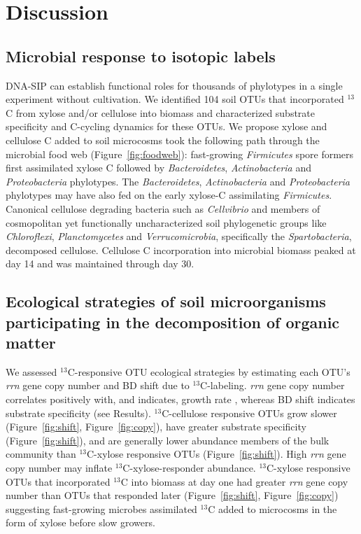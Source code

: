 \section{Discussion} 
\subsection{Microbial response to isotopic labels}
DNA-SIP can establish functional roles for thousands of phylotypes in a single
experiment without cultivation. We identified 104 soil OTUs that
incorporated $^{13}$C from xylose and/or cellulose into biomass and
characterized substrate specificity and C-cycling dynamics for these OTUs. We
propose xylose and cellulose C added to soil microcosms took the following path
through the microbial food web (Figure~\ref{fig:foodweb}): fast-growing
\textit{Firmicutes} spore formers first assimilated xylose C followed by
\textit{Bacteroidetes}, \textit{Actinobacteria} and \textit{Proteobacteria}
phylotypes. The \textit{Bacteroidetes}, \textit{Actinobacteria} and
\textit{Proteobacteria} phylotypes may have also fed on the early xylose-C
assimilating \textit{Firmicutes}. Canonical cellulose degrading bacteria such
as \textit{Cellvibrio} and members of cosmopolitan yet functionally
uncharacterized soil phylogenetic groups like \textit{Chloroflexi},
\textit{Planctomycetes} and \textit{Verrucomicrobia}, specifically the
\textit{Spartobacteria}, decomposed cellulose. Cellulose C incorporation into
microbial biomass peaked at day 14 and was maintained through day 30.

\subsection{Ecological strategies of soil microorganisms participating in the
decomposition of organic matter}
We assessed $^{13}$C-responsive OTU ecological strategies by estimating each
OTU's \textit{rrn} gene copy number and BD shift due to $^{13}$C-labeling.
\textit{rrn} gene copy number correlates positively with, and indicates, growth
rate \citep{11125085,Kembel_2012}, whereas BD shift indicates substrate
specificity (see Results). $^{13}$C-cellulose responsive OTUs grow slower
(Figure~\ref{fig:shift}, Figure~\ref{fig:copy}), have greater substrate
specificity (Figure~\ref{fig:shift}), and are generally lower abundance members
of the bulk community than $^{13}$C-xylose responsive OTUs
(Figure~\ref{fig:shift}). High \textit{rrn} gene copy number may inflate
$^{13}$C-xylose-responder abundance. $^{13}$C-xylose responsive OTUs that
incorporated $^{13}$C into biomass at day one had greater \textit{rrn} gene
copy number than OTUs that responded later (Figure~\ref{fig:shift},
Figure~\ref{fig:copy}) suggesting fast-growing microbes assimilated $^{13}$C
added to microcosms in the form of xylose before slow growers.


